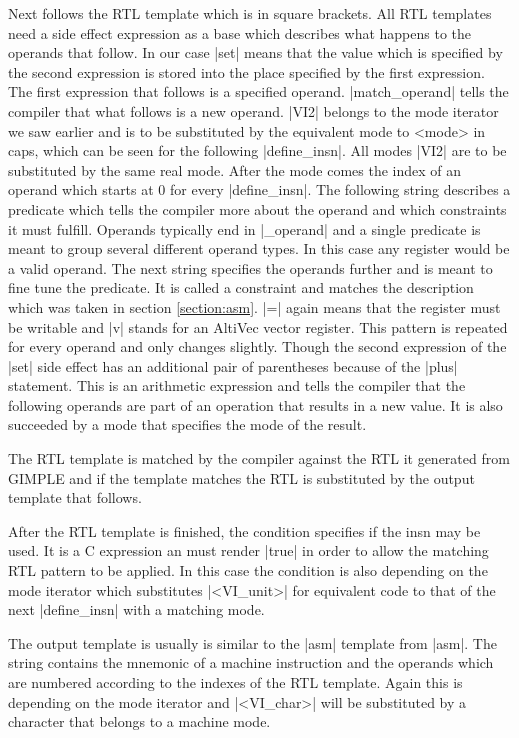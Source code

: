 Next follows the RTL template which is in square brackets.
All RTL templates need a side effect expression as a base which describes what happens to the operands that follow.
In our case |set| means that the value which is specified by the second expression is stored into the place specified by the first expression. 
The first expression that follows is a specified operand.
|match_operand| tells the compiler that what follows is a new operand.
|VI2| belongs to the mode iterator we saw earlier and is to be substituted by the equivalent mode to <mode> in caps, which can be seen for the following |define_insn|.
All modes |VI2| are to be substituted by the same real mode.
After the mode comes the index of an operand which starts at 0 for every |define_insn|.
The following string describes a predicate which tells the compiler more about the operand and which constraints it must fulfill.
Operands typically end in |_operand| and a single predicate is meant to group several different operand types.
In this case any register would be a valid operand. \cite{GCCint:predicates}
The next string specifies the operands further and is meant to fine tune the predicate.
It is called a constraint and matches the description which was taken in section \ref{section:asm}.
|=| again means that the register must be writable and |v| stands for an AltiVec vector register.\cite{GCCint:constraints}
This pattern is repeated for every operand and only changes slightly.
Though the second expression of the |set| side effect has an additional pair of parentheses because of the |plus| statement.
This is an arithmetic expression and tells the compiler that the following operands are part of an operation that results in a new value.
It is also succeeded by a mode that specifies the mode of the result.\cite{GCCint:arith}

The RTL template is matched by the compiler against the RTL it generated from GIMPLE and if the template matches the RTL is substituted by the output template that follows.

After the RTL template is finished, the condition specifies if the insn may be used.
It is a C expression an must render |true| in order to allow the matching RTL pattern to be applied.
In this case the condition is also depending on the mode iterator which substitutes |<VI_unit>| for equivalent code to that of the next |define_insn| with a matching mode. \cite{GCCint:defineinsn}

The output template is usually is similar to the |asm| template from |asm|.
The string contains the mnemonic of a machine instruction and the operands which are numbered according to the indexes of the RTL template.
Again this is depending on the mode iterator and |<VI_char>| will be substituted by a character that belongs to a machine mode. \cite{GCCint:defineinsn}

